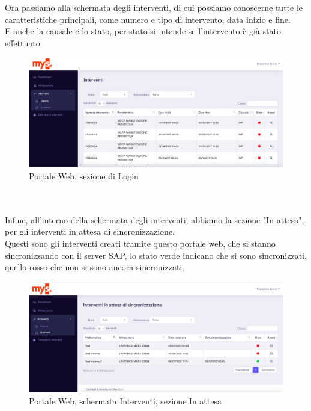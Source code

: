 Ora passiamo alla schermata degli interventi, di cui possiamo conoscerne tutte le caratteristiche principali, come numero e tipo di intervento, data inizio e fine.\\
E anche la causale e lo stato, per stato si intende se l'intervento è già stato effettuato.
\begin{figure}[!h] 
	\centering 
	\includegraphics[scale = 0.25]{immagini/portale/interventi.png} 
	\caption {Portale Web, sezione di Login}
\end{figure}
\\\\Infine, all'interno della schermata degli interventi, abbiamo la sezione "In attesa", per gli interventi in attesa di sincronizzazione.\\
Questi sono gli interventi creati tramite questo portale web, che si stanno sincronizzando con il server SAP, lo stato verde indicano che si sono sincronizzati, quello rosso che non si sono ancora sincronizzati.
\begin{figure}[!h] 
	\centering 
	\includegraphics[scale = 0.25]{immagini/portale/interventi-in-attesa.png} 
	\caption {Portale Web, schermata Interventi, sezione In attesa}
\end{figure}
\pagebreak
